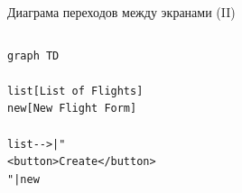 \documentclass[aspectratio=169,handout,bigger]{beamer}
\begin{document}
\begin{frame}[fragile]{Диаграма переходов между экранами (II)}
  \begin{columns}
    \begin{column}{.5\textwidth}
\begin{verbatim}
graph TD

list[List of Flights]
new[New Flight Form]

list-->|"
<button>Create</button>
"|new
\end{verbatim}
\end{column}
\begin{column}{.5\textwidth}
\end{column}
\end{columns}
\end{frame}

\end{document}
